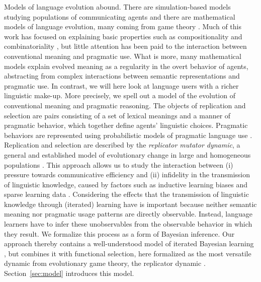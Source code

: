 \documentclass[a4paper, 11pt]{article}
\theoremstyle{Satz}
\begin{document}
Models of language evolution abound. There are simulation-based models studying
populations of communicating agents
\citep{Hurford1989:Biological-Evol,Steels1995:A-Self-Organizi,LenaertsJansen2005:The-Evolutionar,SteelsBelpaeme2005:Coordinating-Pe,BaronchelliPuglisi2008:Cultural-route-,steels:2011,SpikeStadler2016:Minimal-Require}
and there are mathematical models of language evolution, many coming from game theory
\citep{Warneryd1993:Cheap-Talk-Coor,BlumeKim1993:Evolutionary-St,nowak+krakauer:1999,nowak:2006,Huttegger2007:Evolution-and-t,Skyrms2010:Signals}. Much
of this work has focused on explaining basic properties such as compositionality and
combinatoriality
\citep[e.g.,][]{Batali1998:Computational-S,nowak+krakauer:1999,nowak+etal:2000,KirbyHurford2002:The-Emergence-o,kirby:2002,SmithKirby2003:Iterated-Learni,Gong2007:Language-Evolut,kirby+etal:2015,verhoef+etal:2014,Franke2015:Proto-Syntax},
but little attention has been paid to the interaction between conventional meaning and
pragmatic use. What is more, many mathematical models explain evolved meaning as a regularity
in the overt behavior of agents, abstracting from complex interactions between semantic
representations and pragmatic use. In contrast, we will here look at language users with a
richer linguistic make-up. More precisely, we spell out a model of the evolution of conventional meaning and pragmatic reasoning.
The objects of replication and selection are pairs consisting of a set of lexical
meanings and a manner of pragmatic behavior, which together define agents' linguistic choices. Pragmatic behaviors are represented using probabilistic models of pragmatic language use \citep{frank+goodman:2012,FrankeJager2015:Probabilistic-p,GoodmanFrank2016:Pragmatic-Langu}. Replication
and selection are described by the \emph{replicator mutator dynamic}, a general and established
model of evolutionary change in large and homogeneous populations
\citep{Hofbauer1985:The-Selection-M,nowak+etal:2000,NowakKomarova2001:Evolution-of-Un,hofbauer+sigmund:2003,nowak:2006}. This
approach allows us to study the interaction between (i) pressure towards communicative
efficiency and (ii) infidelity in the transmission of linguistic knowledge, caused by factors
such as inductive learning biases and sparse learning data \citep{KirbyHurford2002:The-Emergence-o,SmithKirby2003:Iterated-Learni,KirbyGriffith2014:Iterated-Learni}. Considering the effects that the transmission of
linguistic knowledge through (iterated) learning have is important because neither semantic meaning nor pragmatic usage
patterns are directly observable. Instead, language learners have to infer these unobservables from the observable behavior in which they result. We formalize this process as a form of
Bayesian inference. Our approach thereby contains a well-understood model of
iterated Bayesian learning \citep{griffiths+kalish:2005,griffiths+kalish:2007}, but combines it with functional
selection, here formalized as the most versatile dynamic from evolutionary game theory, the
replicator dynamic \citep{TaylorJonker1978:Evolutionary-St}. Section~\ref{sec:model} introduces
this model.
\end{document}
